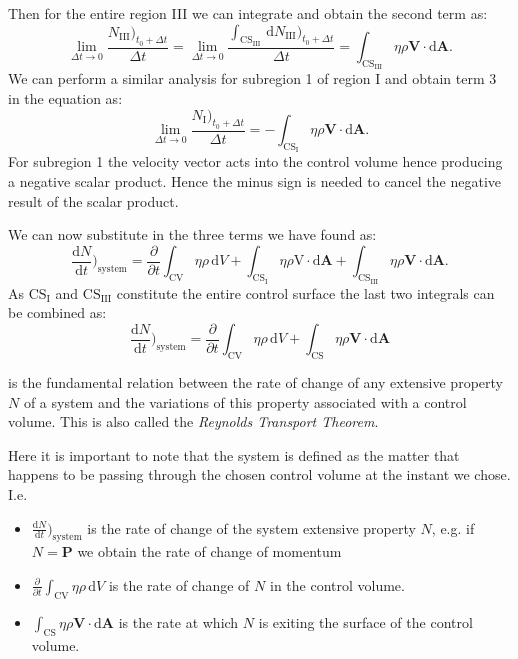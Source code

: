 Then for the entire region III we can integrate and obtain the second term as:
\[ 
\lim_{\Delta t \to 0} \frac{N_{\mathrm{III}})_{t_0 + \Delta t}}{\Delta t} = \lim_{\Delta t \to 0} \frac{\int_{\mathrm{CS}_{\mathrm{III}}} \, \mathrm{d}N_{\mathrm{III}})_{t_0 + \Delta t} }{\Delta t} = \int_{\mathrm{CS}_{\mathrm{III}}} \eta \rho \textbf{V} \cdot \mathrm{d}\textbf{A}
.\]
We can perform a similar analysis for subregion 1 of region I and obtain term 3 in the equation as:
\[ 
\lim_{\Delta t \to 0} \frac{N_{\mathrm{I}} )_{t_0 + \Delta t}}{\Delta t} = - \int_{\mathrm{CS}_{\mathrm{I}}} \eta \rho \textbf{V} \cdot \mathrm{d} \textbf{A}
.\]
For subregion 1 the velocity vector acts into the control volume hence producing a negative scalar product. Hence the minus sign is needed to cancel the negative result of the scalar product.

We can now substitute in the three terms we have found as:
\[ 
\frac{\mathrm{d}N}{\mathrm{d}t} \bigg)_{\mathrm{system}} = \frac{\partial}{\partial t} \int_{\mathrm{CV}} \eta \rho \, \mathrm{d}V + \int_{\mathrm{CS}_{\mathrm{I}}} \eta \rho \mathrm{V} \cdot \mathrm{d} \textbf{A} + \int_{\mathrm{CS}_{\mathrm{III}}} \eta \rho \textbf{V} \cdot \mathrm{d} \textbf{A}
.\]
As $\mathrm{CS}_{\mathrm{I}}$ and $\mathrm{CS}_{\mathrm{III}}$ constitute the entire control surface the last two integrals can be combined as:
\begin{equation}\label{eq:reytra}
  \frac{\mathrm{d}N}{\mathrm{d}t} \bigg)_{\mathrm{system}} = \frac{\partial}{\partial t} \int_{\mathrm{CV}} \eta \rho \, \mathrm{d}V + \int_{\mathrm{CS}} \eta \rho \textbf{V} \cdot \mathrm{d} \textbf{A}
\end{equation}

 is the fundamental relation between the rate of change of any extensive property $N$ of a system and the variations of this property associated with a control volume. This is also called the \textit{Reynolds Transport Theorem}. 

Here it is important to note that the system is defined as the matter that happens to be passing through the chosen control volume at the instant we chose. I.e.
\begin{itemize}
  \item $\frac{\mathrm{d}N}{\mathrm{d}t} \bigg)_{\mathrm{system}}$ is the rate of change of the system extensive property $N$, e.g. if $N = \textbf{P}$ we obtain the rate of change of momentum
  \item $\frac{\partial}{\partial t} \int_{\mathrm{CV}} \eta \rho \, \mathrm{d}V$ is the rate of change of $N$ in the control volume. 
  \item $\int_{\mathrm{CS}} \eta \rho \textbf{V} \cdot \mathrm{d} \textbf{A}$ is the rate at which $N$ is exiting the surface of the control volume. 
\end{itemize}

